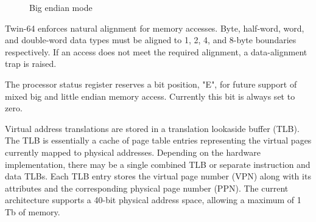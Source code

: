 \begin{figure}[H]
\begin{center}
\end{center}
\caption{Big endian mode}
\label{fig:Big endian mode}
\end{figure}

Twin-64 enforces natural alignment for memory accesses. Byte, half-word, word, and double-word data types must be aligned to 1, 2, 4, and 8-byte boundaries respectively. If an access does not meet the required alignment, a data-alignment trap is raised.

The processor status register reserves a bit position, "E", for future support of mixed big and little endian memory access. Currently this bit is always set to zero.



Virtual address translations are stored in a translation lookaside buffer (TLB). The TLB is essentially a cache of page table entries representing the virtual pages currently mapped to physical addresses. Depending on the hardware implementation, there may be a single combined TLB or separate instruction and data TLBs. Each TLB entry stores the virtual page number (VPN) along with its attributes and the corresponding physical page number (PPN). The current architecture supports a 40-bit physical address space, allowing a maximum of 1 Tb of memory.

